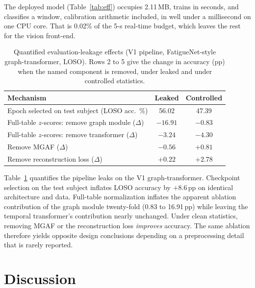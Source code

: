 \documentclass[journal]{IEEEtran}
\newcommand{\pp}{\,pp}
\begin{document}
The deployed model (Table~\ref{tab:eff}) occupies 2.11\,MB, trains in
seconds, and classifies a window, calibration arithmetic included, in well
under a millisecond on one CPU core. That is 0.02\% of the 5-s real-time
budget, which leaves the rest for the vision front-end.

\begin{table}[!t]
\caption{Quantified evaluation-leakage effects (V1 pipeline, FatigueNet-style
graph-transformer, LOSO). Rows 2 to 5 give the change in accuracy (pp) when
the named component is removed, under leaked and under controlled statistics.}
\label{tab:leak}
\centering\footnotesize
\begin{tabular}{@{}lcc@{}}
\toprule
Mechanism & Leaked & Controlled \\
\midrule
Epoch selected on test subject (LOSO acc.\ \%) & 56.02 & 47.39 \\
Full-table $z$-scores: remove graph module ($\Delta$)   & $-16.91$ & $-0.83$ \\
Full-table $z$-scores: remove transformer ($\Delta$)    & $-3.24$  & $-4.30$ \\
Remove MGAF ($\Delta$)                                  & $-0.56$  & $+0.81$ \\
Remove reconstruction loss ($\Delta$)                   & $+0.22$  & $+2.78$ \\
\bottomrule
\end{tabular}
\end{table}

Table~\ref{tab:leak} quantifies the pipeline leaks on the V1
graph-transformer. Checkpoint selection on the test subject inflates LOSO
accuracy by $+8.6$\pp{} on identical architecture and data. Full-table
normalization inflates the apparent ablation contribution of the graph module
twenty-fold (0.83 to 16.91\pp) while leaving the temporal transformer's
contribution nearly unchanged. Under clean statistics, removing MGAF or the
reconstruction loss \emph{improves} accuracy. The same ablation therefore
yields opposite design conclusions depending on a preprocessing detail that is
rarely reported.

\section{Discussion}
\end{document}
